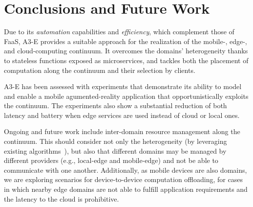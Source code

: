 \section{Conclusions and Future Work}\label{sec:conclusions}

Due to its \textit{automation} capabilities and \textit{efficiency}, which complement those of FaaS, A3-E provides a suitable approach for the realization of the mobile-, edge-, and cloud-computing continuum. It overcomes the domains' heterogeneity thanks to stateless functions exposed as microservices, and tackles both the placement of computation along the continuum and their selection by clients.

A3-E has been assessed with experiments that demonstrate its ability to model and enable a mobile agumented-reality application that opportunistically exploits the continuum. The experiments also show a substantial reduction of both latency and battery when edge services are used instead of cloud or local ones. 

Ongoing and future work include inter-domain resource management along the continuum. This should consider not only the heterogeneity (by leveraging existing algorithms~\cite{Tarneberg2017}), but also that different domains may be managed by different providers (e.g., local-edge and mobile-edge) and not be able to communicate with one another. Additionally, as mobile devices are also domains, we are exploring scenarios for device-to-device computation offloading, for cases in which nearby edge domains are not able to fulfill application requirements and the latency to the cloud is prohibitive.

